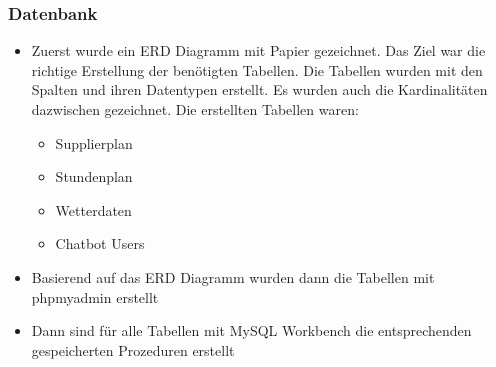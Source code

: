 \subsubsection{Datenbank}
\begin{itemize}
	\item Zuerst wurde ein ERD Diagramm mit Papier gezeichnet. Das Ziel war die richtige Erstellung der benötigten Tabellen. Die Tabellen wurden mit den Spalten und ihren Datentypen erstellt. Es wurden auch die Kardinalitäten dazwischen gezeichnet. Die erstellten Tabellen waren:
	
	\begin{itemize}
		\item Supplierplan
	\end{itemize}
    \begin{itemize}
    	\item Stundenplan
    \end{itemize}
    \begin{itemize}
    	\item Wetterdaten
    \end{itemize}
    \begin{itemize}
	\item Chatbot Users
    \end{itemize}	
\end{itemize}
\begin{itemize}
	\item Basierend auf das ERD Diagramm wurden dann die Tabellen mit phpmyadmin erstellt
\end{itemize}
\begin{itemize}
	\item Dann sind für alle Tabellen mit MySQL Workbench die entsprechenden gespeicherten Prozeduren erstellt 
\end{itemize}	
